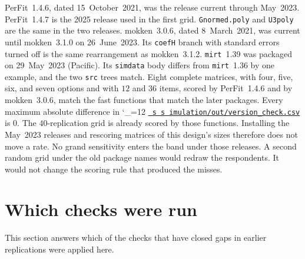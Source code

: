 \documentclass[11pt]{article}
\makeatletter
\newcommand{\proofbase}{https://github.com/alectionary/vibe-math/blob/master/formalization/polytomous-person-fit}
\def\pf@show#1{%
  \ifx\relax#1\else
    #1\allowbreak
    \expandafter\pf@show
  \fi}
\newcommand{\src}{\begingroup\catcode`\_=12 \pf@src}
\newcommand{\pf@src}[1]{%
  \edef\srcurl{\proofbase/#1}%
  \href{\srcurl}{\texttt{\pf@show#1\relax}}\endgroup}
\makeatother
\begin{document}
PerFit~1.4.6, dated 15~October~2021, was the release current through
May~2023.
PerFit~1.4.7 is the 2025 release used in the first grid.
\texttt{Gnormed.poly} and \texttt{U3poly} are the same in the two
releases.
mokken~3.0.6, dated 8~March~2021, was current until mokken~3.1.0 on
26~June~2023.
Its \texttt{coefH} branch with standard errors turned off is the same
rearrangement as mokken~3.1.2.
\texttt{mirt}~1.39 was packaged on 29~May~2023 (Pacific).
Its \texttt{simdata} body differs from \texttt{mirt}~1.36 by one
example, and the two \texttt{src} trees match.
Eight complete matrices, with four, five, six, and seven options and
with \(12\) and \(36\) items, scored by PerFit~1.4.6 and by mokken~3.0.6,
match the fast functions that match the later packages.
Every maximum absolute difference in
\src{simulation/out/version_check.csv} is \(0\).
The \(40\)-replication grid is already scored by those functions.
Installing the May~2023 releases and rescoring matrices of this
design's sizes therefore does not move a rate.
No grand sensitivity enters the band under those releases.
A second random grid under the old package names would redraw the
respondents.
It would not change the scoring rule that produced the misses.

\section{Which checks were run}
\label{sec:audit}

This section answers which of the checks that have closed gaps in
earlier replications were applied here.
\end{document}
